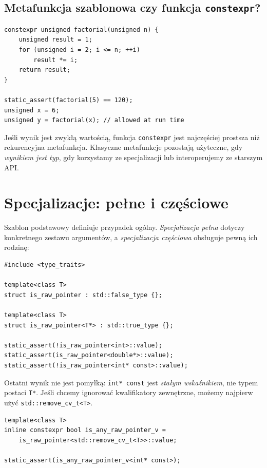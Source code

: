 \subsection{Metafunkcja szablonowa czy funkcja \texttt{constexpr}?}

\begin{lstlisting}
constexpr unsigned factorial(unsigned n) {
    unsigned result = 1;
    for (unsigned i = 2; i <= n; ++i)
        result *= i;
    return result;
}

static_assert(factorial(5) == 120);
unsigned x = 6;
unsigned y = factorial(x); // allowed at run time
\end{lstlisting}

Jeśli wynik jest zwykłą wartością, funkcja \texttt{constexpr} jest
najczęściej prostsza niż rekurencyjna metafunkcja. Klasyczne metafunkcje
pozostają użyteczne, gdy \emph{wynikiem jest typ}, gdy korzystamy ze
specjalizacji lub interoperujemy ze starszym API.

\section{Specjalizacje: pełne i częściowe}
\label{sec:cpp9-specialization}

Szablon podstawowy definiuje przypadek ogólny. \emph{Specjalizacja pełna}
dotyczy konkretnego zestawu argumentów, a \emph{specjalizacja częściowa}
obsługuje pewną ich rodzinę:

\begin{lstlisting}
#include <type_traits>

template<class T>
struct is_raw_pointer : std::false_type {};

template<class T>
struct is_raw_pointer<T*> : std::true_type {};

static_assert(!is_raw_pointer<int>::value);
static_assert(is_raw_pointer<double*>::value);
static_assert(!is_raw_pointer<int* const>::value);
\end{lstlisting}

Ostatni wynik nie jest pomyłką: \texttt{int* const} jest
\emph{stałym wskaźnikiem}, nie typem postaci \texttt{T*}.
Jeśli chcemy ignorować kwalifikatory zewnętrzne, możemy najpierw
użyć \texttt{std::remove\_cv\_t<T>}.

\begin{lstlisting}
template<class T>
inline constexpr bool is_any_raw_pointer_v =
    is_raw_pointer<std::remove_cv_t<T>>::value;

static_assert(is_any_raw_pointer_v<int* const>);
\end{lstlisting}

